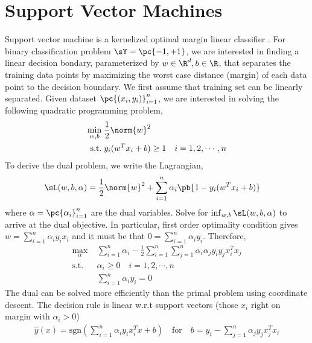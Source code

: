 \documentclass[11pt]{article}
\begin{document}
\section{Support Vector Machines}

Support vector machine is a kernelized optimal margin linear classifier \cite{boserTrainingAlgorithmOptimal1992}. For binary classification problem $\sY=\pc{-1,+1}$, we are interested in finding a linear decision bondary, parameterized by $w\in\R^d,b\in\R$, that separates the training data points by maximizing the worst case distance (margin) of each data point to the decision boundary. We first assume that training set can be linearly separated. Given dataset $\pc{(x_i,y_i)}_{i=1}^n$, we are interested in solving the following quadratic programming problem,
\begin{align*}
    \min_{w,b}
        \;& \frac{1}{2} \norm{w}^2 \\
    \text{s.t.}
        \;& y_i(w^Tx_i + b) \geq 1 \quad i=1,2,\cdots,n
\end{align*}
To derive the dual problem, we write the Lagrangian, 
\begin{align*}
    \sL(w,b,\alpha)
        &= \frac{1}{2} \norm{w}^2 + \sum_{i=1}^n \alpha_i \pb{ 1 - y_i(w^Tx_i+b) }
\end{align*}
where $\alpha = \pc{\alpha_i}_{i=1}^n$ are the dual variables. Solve for $\inf_{w,b} \sL(w,b,\alpha)$ to arrive at the dual objective. In particular, first order optimality condition gives $w = \sum_{i=1}^n \alpha_i y_i x_i$ and it must be that $0=\sum_{i=1}^n \alpha_i y_i$. Therefore, 
\begin{align*}
    \max_{\alpha}
        \;& \sum_{i=1}^n \alpha_i - \frac{1}{2} \sum_{i=1}^n\sum_{j=1}^n \alpha_i \alpha_j y_i y_j x_i^Tx_j \\
    \text{s.t.}
        \;& \alpha_i \geq 0 \quad i=1,2,\cdots, n
            \tag{dual feasibility} \\
        & \sum_{i=1}^n \alpha_i y_i = 0 
            \tag{from $\nabla_b \sL = 0$}
\end{align*}
The dual can be solved more efficiently than the primal problem using coordinate descent. The decision rule is linear w.r.t support vectors (those $x_i$ right on margin with $\alpha_i > 0$)
\begin{align*}
    \hat{y}(x) = \text{sgn}\left(
        \sum_{i=1}^n \alpha_i y_i x_i^T x + b
    \right)
    \quad\text{for}\quad
    b 
        = y_i - \sum_{j=1}^n \alpha_j y_j x_j^T x_i
\end{align*}
\end{document}
